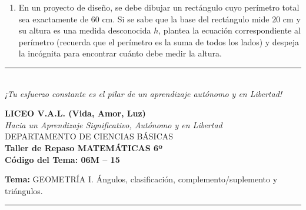 \documentclass[12pt, letterpaper]{article}
\begin{document}
\begin{enumerate}[itemsep=0.8cm]
		A partir de la información de la tabla, escribe la ecuación de primer grado que modela esta situación financiera y resuélvela paso a paso para hallar el precio exacto de un solo combo de palomitas ($x$).
		
		\item En un proyecto de diseño, se debe dibujar un rectángulo cuyo perímetro total sea exactamente de $60\text{ cm}$. Si se sabe que la base del rectángulo mide $20\text{ cm}$ y su altura es una medida desconocida $h$, plantea la ecuación correspondiente al perímetro (recuerda que el perímetro es la suma de todos los lados) y despeja la incógnita para encontrar cuánto debe medir la altura.
		
	\end{enumerate}
	
	\vfill
	\begin{center}
		\rule{0.5\textwidth}{0.4pt} \\
		\vspace{0.2cm}
		\textit{¡Tu esfuerzo constante es el pilar de un aprendizaje autónomo y en Libertad!}
	\end{center}
	
	\newpage
	\begin{center}
		{\Large \textbf{LICEO V.A.L. (Vida, Amor, Luz)}}\\[0.1cm]
		{\normalsize \textit{Hacia un Aprendizaje Significativo, Autónomo y en Libertad}}\\[0.2cm]
		{\large DEPARTAMENTO DE CIENCIAS BÁSICAS}\\[0.1cm]
		\textbf{Taller de Repaso MATEMÁTICAS 6º}\\[0.1cm]
		\textbf{Código del Tema: 06M – 15}\\[0.1cm]
	\end{center}
	
	\vspace{0.2cm}
	\noindent \textbf{Tema:} GEOMETRÍA I. Ángulos, clasificación, complemento/suplemento y triángulos.
	\vspace{0.2cm}
	\hrule
	\vspace{0.4cm}
	
\end{document}

